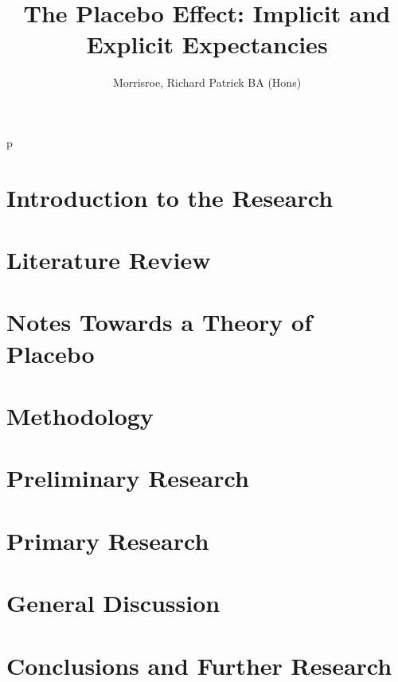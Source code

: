 p\documentclass[apsych, phd]{uccthesis}
\title{The Placebo Effect: Implicit and Explicit Expectancies}
\author{Morrisroe, Richard Patrick BA (Hons)}
\begin{document}
\maketitle



\tableofcontents

\chapter{Introduction to the Research}

%

\chapter{Literature Review}

%

\chapter{Notes Towards a Theory of Placebo}

%

\chapter{Methodology}

%

\chapter{Preliminary Research}

%



%

%


\chapter{Primary Research}

%
\chapter{General Discussion}

\chapter{Conclusions and Further Research}





\end{document}
